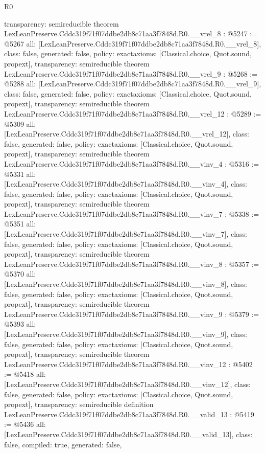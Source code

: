 \begin{lexlean}{R0}
\begin{coremodule}
{  transparency: semireducible
}
theorem LexLeanPreserve.Cddc319f71f07ddbe2db8c71aa3f7848d.R0.__vrel_8 : @5247 := @5267 {
  all: [LexLeanPreserve.Cddc319f71f07ddbe2db8c71aa3f7848d.R0.__vrel_8],
  class: false,
  generated: false,
  policy: exact{axioms: [Classical.choice, Quot.sound, propext]},
  transparency: semireducible
}
theorem LexLeanPreserve.Cddc319f71f07ddbe2db8c71aa3f7848d.R0.__vrel_9 : @5268 := @5288 {
  all: [LexLeanPreserve.Cddc319f71f07ddbe2db8c71aa3f7848d.R0.__vrel_9],
  class: false,
  generated: false,
  policy: exact{axioms: [Classical.choice, Quot.sound, propext]},
  transparency: semireducible
}
theorem LexLeanPreserve.Cddc319f71f07ddbe2db8c71aa3f7848d.R0.__vrel_12 : @5289 := @5309 {
  all: [LexLeanPreserve.Cddc319f71f07ddbe2db8c71aa3f7848d.R0.__vrel_12],
  class: false,
  generated: false,
  policy: exact{axioms: [Classical.choice, Quot.sound, propext]},
  transparency: semireducible
}
theorem LexLeanPreserve.Cddc319f71f07ddbe2db8c71aa3f7848d.R0.__vinv_4 : @5316 := @5331 {
  all: [LexLeanPreserve.Cddc319f71f07ddbe2db8c71aa3f7848d.R0.__vinv_4],
  class: false,
  generated: false,
  policy: exact{axioms: [Classical.choice, Quot.sound, propext]},
  transparency: semireducible
}
theorem LexLeanPreserve.Cddc319f71f07ddbe2db8c71aa3f7848d.R0.__vinv_7 : @5338 := @5351 {
  all: [LexLeanPreserve.Cddc319f71f07ddbe2db8c71aa3f7848d.R0.__vinv_7],
  class: false,
  generated: false,
  policy: exact{axioms: [Classical.choice, Quot.sound, propext]},
  transparency: semireducible
}
theorem LexLeanPreserve.Cddc319f71f07ddbe2db8c71aa3f7848d.R0.__vinv_8 : @5357 := @5370 {
  all: [LexLeanPreserve.Cddc319f71f07ddbe2db8c71aa3f7848d.R0.__vinv_8],
  class: false,
  generated: false,
  policy: exact{axioms: [Classical.choice, Quot.sound, propext]},
  transparency: semireducible
}
theorem LexLeanPreserve.Cddc319f71f07ddbe2db8c71aa3f7848d.R0.__vinv_9 : @5379 := @5393 {
  all: [LexLeanPreserve.Cddc319f71f07ddbe2db8c71aa3f7848d.R0.__vinv_9],
  class: false,
  generated: false,
  policy: exact{axioms: [Classical.choice, Quot.sound, propext]},
  transparency: semireducible
}
theorem LexLeanPreserve.Cddc319f71f07ddbe2db8c71aa3f7848d.R0.__vinv_12 : @5402 := @5418 {
  all: [LexLeanPreserve.Cddc319f71f07ddbe2db8c71aa3f7848d.R0.__vinv_12],
  class: false,
  generated: false,
  policy: exact{axioms: [Classical.choice, Quot.sound, propext]},
  transparency: semireducible
}
definition LexLeanPreserve.Cddc319f71f07ddbe2db8c71aa3f7848d.R0.__valid_13 : @5419 := @5436 {
  all: [LexLeanPreserve.Cddc319f71f07ddbe2db8c71aa3f7848d.R0.__valid_13],
  class: false,
  compiled: true,
  generated: false,
}
\end{coremodule}
\end{lexlean}
